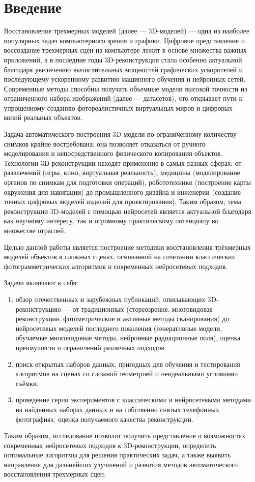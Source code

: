 \chapter{Введение}

Восстановление трехмерных моделей (далее — 3D-моделей) — одна из наиболее
популярных задач компьютерного зрения и графики. Цифровое представление и
воссоздание трехмерных сцен на компьютере лежит в основе множества важных
приложений, а в последние годы 3D-реконструкция стала особенно актуальной
благодаря увеличению вычислительных мощностей графических ускорителей и
последующему ускоренному развитию машинного обучения и нейронных сетей.
Современные методы способны получать объемные модели высокой точности из
ограниченного набора изображений (далее — датасетов), что открывает пути к
упрощенному созданию фотореалистичных виртуальных миров и цифровых копий
реальных объектов.

Задача автоматического построения 3D-модели по ограниченному количеству снимков
крайне востребована: она позволяет отказаться от ручного моделирования и
непосредственного физического копирования объектов. Технологии 3D-реконструкции
находят применение в самых разных сферах: от развлечений (игры, кино,
виртуальная реальность), медицины (моделирование органов по снимкам для
подготовки операций), робототехники (построение карты окружения для навигации)
до промышленного дизайна и инженерии (создание точных цифровых моделей изделий
для проектирования). Таким образом, тема реконструкции 3D-моделей с помощью
нейросетей является актуальной благодаря как научному интересу, так и огромному
практическому потенциалу во множестве отраслей.

Целью данной работы является построение методики восстановления трёхмерных
моделей объектов в сложных сценах, основанной на сочетании классических
фотограмметрических алгоритмов и современных нейросетевых подходов.

Задачи включают в себя:
\begin{enumerate}
  \item обзор отечественных и зарубежных публикаций, описывающих
  3D-реконструкцию — от традиционных (стереозрение, многовидовая реконструкция,
  фотометрические и активные методы сканирования) до нейросетевых моделей
  последнего поколения (генеративные модели, обучаемые многовидовые методы,
  нейронные радиационные поля), оценка преимуществ и ограничений
  различных подходов.
  \item поиск открытых наборов данных, пригодных для обучения и тестирования
  алгоритмов на сценах со сложной геометрией и неидеальными условиями съёмки.
  \item проведение серии экспериментов с классическими и нейросетевыми методами
  на найденных наборах данных и на собственно снятых телефонных фотографиях,
  оценка получаемого качества реконструкции.
\end{enumerate}

Таким образом, исследование позволит получить представление о возможностях
современных нейросетевых подходов к 3D-реконструкции, определить оптимальные
алгоритмы для решения практических задач, а также выявить направления для
дальнейших улучшений и развития методов автоматического восстановления
трехмерных сцен.
